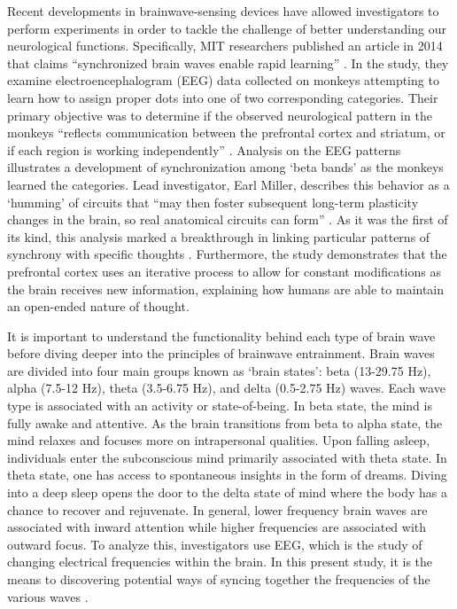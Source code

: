\documentclass{article}[12pt]
\begin{document}
Recent developments in brainwave-sensing devices have allowed investigators to perform experiments in order to tackle the challenge of better understanding our neurological functions. Specifically, MIT researchers published an article in 2014 that claims ``synchronized brain waves enable rapid learning'' \cite{trafton}. In the study, they examine electroencephalogram (EEG) data collected on monkeys attempting to learn how to assign proper dots into one of two corresponding categories.  Their primary objective was to determine if the observed neurological pattern in the monkeys ``reflects communication between the prefrontal cortex and striatum, or if each region is working independently'' \cite{trafton}. Analysis on the EEG patterns illustrates a development of synchronization among ‘beta bands’ as the monkeys learned the categories. Lead investigator, Earl Miller, describes this behavior as a ‘humming’ of circuits that ``may then foster subsequent long-term plasticity changes in the brain, so real anatomical circuits can form'' \cite{trafton}. As it was the first of its kind, this analysis marked a breakthrough in linking particular patterns of synchrony with specific thoughts \cite{trafton}. Furthermore, the study demonstrates that the prefrontal cortex uses an iterative process to allow for constant modifications as the brain receives new information, explaining how humans are able to maintain an open-ended nature of thought.

It is important to understand the functionality behind each type of brain wave before diving deeper into the principles of brainwave entrainment. Brain waves are divided into four main groups known as ‘brain states': beta (13-29.75 Hz), alpha (7.5-12 Hz),  theta (3.5-6.75 Hz), and delta (0.5-2.75 Hz) waves. Each wave type is associated with an activity or state-of-being. In beta state, the mind is fully awake and attentive. As the brain transitions from beta to alpha state, the mind relaxes and focuses more on intrapersonal qualities. Upon falling asleep, individuals enter the subconscious mind primarily associated with theta state. In theta state, one has access to spontaneous insights in the form of dreams.  Diving into a deep sleep opens the door to the delta state of mind where the body has a chance to recover and rejuvenate.
In general, lower frequency brain waves are associated with inward attention while higher frequencies are associated with outward focus. To analyze this, investigators use EEG, which is the study of  changing electrical frequencies within the brain. In this present study, it is the means to discovering potential ways of syncing together the frequencies of the various waves \cite{Giorgio}.  
\end{document}
